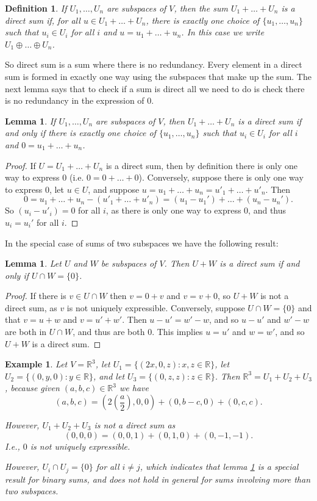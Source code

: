 \documentclass{article}
\theoremstyle{plain}
\newtheorem{definition}[theorem]{Definition}{\bfseries}{\upshape}
\newtheorem{lemma}[theorem]{Lemma}{\bfseries}{\upshape}
\newtheorem{example}[theorem]{Example}{\bfseries}{\upshape}
\newcommand{\bR}{\mathbb{R}}
\begin{document}
\begin{definition}
If $U_1,\ldots,U_n$ are subspaces of $V$, then the sum $U_1+\ldots +U_n$ is a \emph{direct sum} if, for all $u\in U_1+\ldots +U_n$, there is exactly one choice of $\{u_1,\ldots, u_n\}$ such that $u_i\in U_i$ for all $i$ and $u = u_1+\ldots +u_n$. In this case we write $U_1\oplus\ldots\oplus U_n$.
\end{definition}

So direct sum is a sum where there is no redundancy. Every element in a direct sum is formed in exactly one way using the subspaces that make up the sum. The next lemma says that to check if a sum is direct all we need to do is check there is no redundancy in the expression of 0.

\begin{lemma}\label{L:LA1direct}
If $U_1,\ldots,U_n$ are subspaces of $V$, then $U_1+\ldots +U_n$ is a direct sum if and only if there is exactly one choice of $\{u_1,\ldots, u_n\}$ such that $u_i\in U_i$ for all $i$ and $0 = u_1+\ldots +u_n$. 
\end{lemma}
\begin{proof}
If $U=U_1+\ldots +U_n$ is a direct sum, then by definition there is only one way to express $0$ (i.e. $0= 0+\ldots + 0$). Conversely, suppose there is only one way to express $0$, let $u\in U$, and suppose $u = u_1+\ldots + u_n = u'_1+\ldots + u'_n$. Then 
\[0 = u_1+\ldots + u_n - (u'_1+\ldots + u'_n) = (u_1-u_1') + \ldots + (u_n-u_n').\]
So $(u_i- u'_i) = 0$ for all $i$, as there is only one way to express $0$, and thus $u_i = u_i'$ for all $i$.  
\end{proof}

In the special case of sums of two subspaces we have the following result:

\begin{lemma}\label{L:LA1cap}
Let $U$ and $W$ be subspaces of $V$. Then $U+W$ is a direct sum if and only if $U\cap W = \{0\}$.
\end{lemma}
\begin{proof}
If there is $v\in U\cap W$ then $v = 0 +v$ and $v = v + 0$, so $U+W$ is not a direct sum, as $v$ is not uniquely expressible. Conversely, suppose $U\cap W=\{0\}$ and that $v = u + w$ and $v = u' + w'$. Then $u-u' = w' -w$, and so $u - u'$ and $w'-w$ are both in $U\cap W$, and thus are both $0$. This implies $u= u'$ and $w = w'$, and so $U+W$ is a direct sum.
\end{proof}

\begin{example}
Let $V = \bR^3$, let $U_1 = \{(2x, 0, z): x,z\in \bR\}$, let $U_2 = \{(0,y,0): y\in \bR\}$, and let $U_3 = \{(0,z,z): z\in\bR\}$. Then $\bR^3 = U_1 + U_2 + U_3$, because given $(a,b,c)\in\bR^3$ we have 
\[(a,b,c) = (2(\frac{a}{2}), 0, 0) + (0, b-c, 0) + (0,c,c).\]

However, $U_1+U_2+U_3$ is not a direct sum as 
\[(0,0,0) = (0,0,1) + (0,1,0) + (0,-1,-1).\] 
I.e., $0$ is not uniquely expressible.

However, $U_i\cap U_j = \{0\}$ for all $i\neq j$, which indicates that lemma \ref{L:LA1cap} is a special result for binary sums, and does not hold in general for sums involving more than two subspaces.
\end{example}
\end{document}
